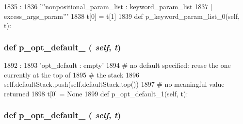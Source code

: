 \begin{DoxyCode}
1835                                              :
1836         '''nonpositional_param_list : keyword_param_list
1837                                     | excess_args_param'''
1838         t[0] = t[1]
1839 
    def p_keyword_param_list_0(self, t):
\end{DoxyCode}
\hypertarget{classisa__parser_1_1ISAParser_ab46371ade3facb8510c3aa644d77bc5a}{
\subsubsection[{p\_\-opt\_\-default\_\-0}]{\setlength{\rightskip}{0pt plus 5cm}def p\_\-opt\_\-default\_ ( {\em self}, \/   {\em t})}}
\label{classisa__parser_1_1ISAParser_ab46371ade3facb8510c3aa644d77bc5a}



\begin{DoxyCode}
1892                                 :
1893         'opt_default : empty'
1894         # no default specified: reuse the one currently at the top of
1895         # the stack
1896         self.defaultStack.push(self.defaultStack.top())
1897         # no meaningful value returned
1898         t[0] = None
1899 
    def p_opt_default_1(self, t):
\end{DoxyCode}
\hypertarget{classisa__parser_1_1ISAParser_a33c801c6d0fa29ce3a49089e3968f81c}{
\subsubsection[{p\_\-opt\_\-default\_\-1}]{\setlength{\rightskip}{0pt plus 5cm}def p\_\-opt\_\-default\_ ( {\em self}, \/   {\em t})}}
\label{classisa__parser_1_1ISAParser_a33c801c6d0fa29ce3a49089e3968f81c}



